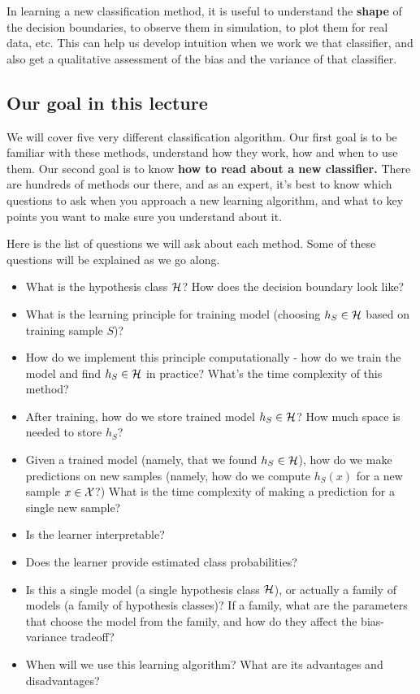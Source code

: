       In learning a new classification method, it is useful to understand the
      {\bf shape} of the decision boundaries, to observe them in simulation, to
	plot them for real data, etc. This can help us develop intuition when we
	work we that classifier, and also get a qualitative assessment of the
	bias and the variance of that classifier. 
      
	\subsection{Our goal in this lecture}

	We will cover five very different classification algorithm. Our first
	goal is to be familiar with these methods, understand how they work, how
	and when to use them. Our second goal is to know {\bf how to read about
	a new classifier.} There are hundreds of methods our there, and as an
	expert, it's best to know which questions to ask when you approach a new
	learning algorithm, and what to key points you want to make sure you
	understand about it.

	Here is the list of questions we will ask about each method. Some of
	these questions will be explained as we go along.

\begin{itemize}
  \item What is the hypothesis class $\mathcal{H}$? How does the decision boundary look
    like?
  \item What is the learning principle for training model (choosing $h_S\in\mathcal{H}$
    based on training sample $S$)?
  \item How do we implement this principle computationally - how do we train the
    model and find $h_S\in\mathcal{H}$ in practice? What's the time complexity of this method?
    \item After training, how do we store trained model $h_S\in\mathcal{H}$? How much space
    is needed to store $h_S$?
  \item Given a trained model (namely, that we found $h_S\in\mathcal{H}$), how do we make
    predictions on new samples (namely, how do we compute $h_S(x)$ for a new
    sample $x\in\mathcal{X}$?) What is the time complexity of making a
    prediction for a single new sample?
  \item Is the learner interpretable?
  \item Does the learner provide estimated class probabilities?
  \item Is this a single model (a single hypothesis class $\mathcal{H}$), or actually a
    family of models (a family of hypothesis classes)? If a family, what are the
    parameters that choose the model from the family, and how do they affect the
    bias-variance tradeoff?
    \item When will we use this learning algorithm? What are its advantages and
      disadvantages?
\end{itemize}

